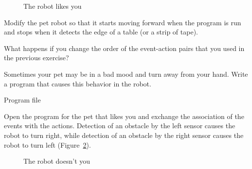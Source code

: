 \begin{figure}
\begin{center}
\caption{The robot likes you}\label{fig.likes}
\end{center}
\end{figure}


Modify the pet robot so that it starts moving forward when the program
is run and stops when it detects the edge of a table (or a strip of
tape).


What happens if you change the order of
the event-action pairs that you used in the previous exercise?




Sometimes your pet may be in a bad mood and turn away from your hand.
Write a program that causes this behavior in the robot.

{\raggedleft \hfill Program file }

Open the program for the pet that likes you and exchange the association
of the events with the actions. Detection of an obstacle by the left
sensor causes the robot to turn right, while detection of an obstacle by
the right sensor causes the robot to turn left (Figure~\ref{fig.hates}).

\begin{figure}[htb]
\begin{center}
\caption{The robot doesn't you}\label{fig.hates}
\end{center}
\end{figure}

